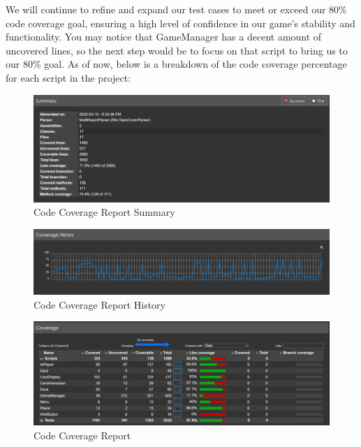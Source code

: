 \documentclass[12pt, titlepage]{article}
\begin{document}
We will continue to refine and expand our test cases to meet or exceed our 80\% code coverage goal, ensuring a high level of confidence in our game's stability and functionality. You may notice that GameManager has a decent amount of uncovered lines, so the next step would be to focus on that script to bring us to our 80\% goal.
As of now, below is a breakdown of the code coverage percentage for each script in the project:
\begin{figure}[h]
    \centering
    \includegraphics[width=1.1\textwidth]{coverage1.png}  %
    \caption{Code Coverage Report Summary}
    \label{fig:coverage}
\end{figure}
\begin{figure}[h]
    \centering
    \includegraphics[width=1.1\textwidth]{coverage2.png}  %
    \caption{Code Coverage Report History}
    \label{fig:coverage}
\end{figure}
\begin{figure}[h]
    \centering
    \includegraphics[width=1.1\textwidth]{coverage3.png}  %
    \caption{Code Coverage Report}
    \label{fig:coverage}
\end{figure}
\end{document}
